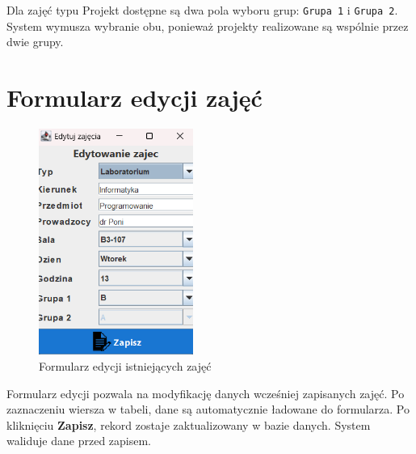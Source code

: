Dla zajęć typu Projekt dostępne są dwa pola wyboru grup: \texttt{Grupa 1} i \texttt{Grupa 2}. System wymusza wybranie obu, ponieważ projekty realizowane są wspólnie przez dwie grupy.

\section*{Formularz edycji zajęć}
\begin{figure}[H]
\centering
\includegraphics[width=0.45\textwidth]{figures/workApl/edit_panel.png}
\caption{Formularz edycji istniejących zajęć}
\label{fig:edit_panel}
\end{figure}

Formularz edycji pozwala na modyfikację danych wcześniej zapisanych zajęć. Po zaznaczeniu wiersza w tabeli, dane są automatycznie ładowane do formularza. Po kliknięciu \textbf{Zapisz}, rekord zostaje zaktualizowany w bazie danych. System waliduje dane przed zapisem.

